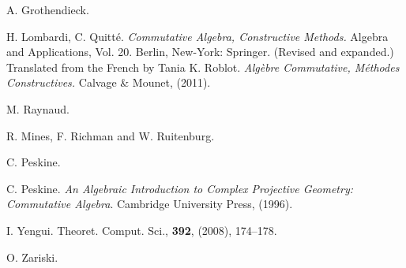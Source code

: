 \documentclass[11pt,a4paper,twoside]{article}
\begin{document}
\begin{thebibliography}{50}
%

{\sc A. Grothendieck}.
\newblock{}



{\sc H. Lombardi, C. Quitt\'e}.
{\em Commutative Algebra, Constructive Methods.} Algebra and Applications, Vol. 20. Berlin, New-York: Springer. (Revised and expanded.) Translated from the French by Tania K. Roblot. {\em Alg\`ebre Commutative, M\'ethodes Constructives.}
{Calvage \& Mounet, (2011).}

  {\sc M. Raynaud}. 


{\sc R. Mines, F. Richman and W. Ruitenburg}.

{\sc C. Peskine}.


 {\sc C. Peskine}. {\em An Algebraic Introduction to Complex Projective Geometry: Commutative Algebra}.
Cambridge University Press, (1996).






{\sc I. Yengui}. 
\newblock Theoret. Comput. Sci., {\bf 392},
(2008), 174--178.



{\sc O. Zariski.}



\end{thebibliography}
\end{document}
